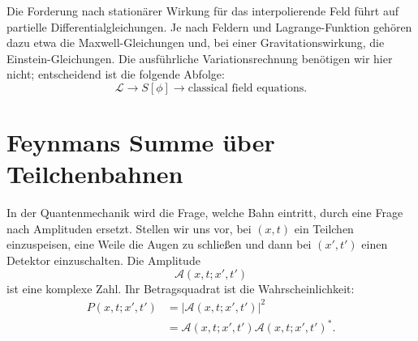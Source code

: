 \begin{classroomqa}
\end{classroomqa}

\begin{classroomqa}
\end{classroomqa}

Die Forderung nach stationärer Wirkung für das interpolierende Feld führt auf partielle Differentialgleichungen. Je nach Feldern und Lagrange-Funktion gehören dazu etwa die Maxwell-Gleichungen und, bei einer Gravitationswirkung, die Einstein-Gleichungen. Die ausführliche Variationsrechnung benötigen wir hier nicht; entscheidend ist die folgende Abfolge:
\begin{equation}
\mathcal{L}
\longrightarrow
S[\phi]
\longrightarrow
\text{classical field equations}.
\end{equation}

\section{Feynmans Summe über Teilchenbahnen}

In der Quantenmechanik wird die Frage, welche Bahn eintritt, durch eine Frage nach Amplituden ersetzt. Stellen wir uns vor, bei \((x,t)\) ein Teilchen einzuspeisen, eine Weile die Augen zu schließen und dann bei \((x',t')\) einen Detektor einzuschalten. Die Amplitude
\begin{equation}
\mathcal{A}(x,t;x',t')
\end{equation}
ist eine komplexe Zahl. Ihr Betragsquadrat ist die Wahrscheinlichkeit:
\begin{equation}
\begin{aligned}
P(x,t;x',t')
&=\left|\mathcal{A}(x,t;x',t')\right|^2\\
&=\mathcal{A}(x,t;x',t')
\mathcal{A}(x,t;x',t')^*.
\end{aligned}
\end{equation}

